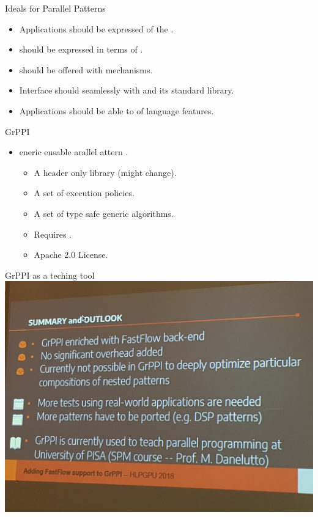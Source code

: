 \begin{frame}[t]{Ideals for Parallel Patterns}
\begin{itemize}[<+->]
  \item Applications should be expressed  of the
        .
  \vfill
  \item {} should be expressed in terms of 
        .
  \vfill
  \item {} should be offered with 
        mechanisms.
  \vfill
  \item Interface should  seamlessly with  and
        its standard library.
  \vfill
  \item Applications should be able to  of  language features.
\end{itemize}
\end{frame}

\begin{frame}[t]{GrPPI}
\begin{Large}
\end{Large}
\vfill\pause
\begin{itemize}
  \item {}eneric eusable arallel
        attern .
    \begin{itemize}
      \item A header only library (might change).
      \item A set of execution policies.
      \item A set of type safe generic algorithms.
      \item Requires .
      \item Apache 2.0 License.
    \end{itemize}
\end{itemize}
\end{frame}

\begin{frame}[t]{GrPPI as a teching tool}
\includegraphics[width=\textwidth]{img/grppi-upi.jpg}
\end{frame}
